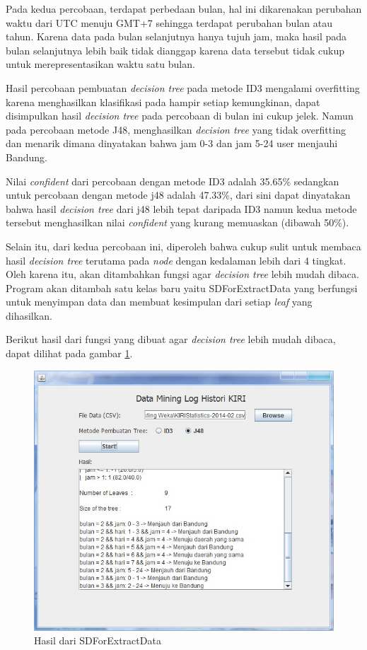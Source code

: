 Pada kedua percobaan, terdapat perbedaan bulan, hal ini dikarenakan perubahan waktu dari UTC menuju GMT+7 sehingga terdapat perubahan bulan atau tahun. Karena data pada bulan selanjutnya hanya tujuh jam, maka hasil pada bulan selanjutnya lebih baik tidak dianggap karena data tersebut tidak cukup untuk merepresentasikan waktu satu bulan.

Hasil percobaan pembuatan \textsl{decision tree} pada metode ID3 mengalami overfitting karena menghasilkan klasifikasi pada hampir setiap kemungkinan, dapat disimpulkan hasil \textsl{decision tree} pada percobaan di bulan ini cukup jelek. Namun pada percobaan metode J48, menghasilkan \textsl{decision tree} yang tidak overfitting dan menarik dimana dinyatakan bahwa jam 0-3 dan jam 5-24 user menjauhi Bandung.

Nilai \textsl{confident} dari percobaan dengan metode ID3 adalah 35.65\% sedangkan untuk percobaan dengan metode j48 adalah 47.33\%, dari sini dapat dinyatakan bahwa hasil \textsl{decision tree} dari j48 lebih tepat daripada ID3 namun kedua metode tersebut menghasilkan nilai \textsl{confident} yang kurang memuaskan (dibawah 50\%).


Selain itu, dari kedua percobaan ini, diperoleh bahwa cukup sulit untuk membaca hasil \textsl{decision tree} terutama pada \textsl{node} dengan kedalaman lebih dari 4 tingkat. Oleh karena itu, akan ditambahkan fungsi agar \textsl{decision tree} lebih mudah dibaca. Program akan ditambah satu kelas baru yaitu SDForExtractData yang berfungsi untuk menyimpan data dan membuat kesimpulan dari setiap \textsl{leaf} yang dihasilkan.

Berikut hasil dari fungsi yang dibuat agar \textsl{decision tree} lebih mudah dibaca, dapat dilihat pada gambar \ref{fig:percobaan3}.

\begin{figure}[H]
\centering
\includegraphics[scale=0.7]{Gambar/percobaan3.jpg}
\caption[Hasil dari SDForExtractData]{Hasil dari SDForExtractData} 
\label{fig:percobaan3}
\end{figure}

